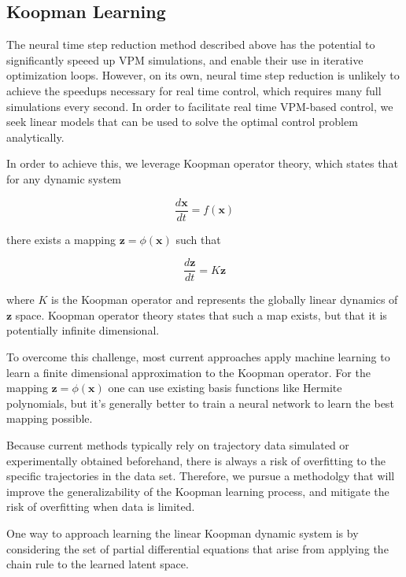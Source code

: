 \documentclass[12pt, letterpaper]{article}
\begin{document}
\subsection{Koopman Learning}

The neural time step reduction method described above has the potential to significantly speeed up VPM simulations, and enable their use in iterative optimization loops.  However, on its own, neural time step reduction is unlikely to achieve the speedups necessary for real time control, which requires many full simulations every second.  In order to facilitate real time VPM-based control, we seek linear models that can be used to solve the optimal control problem analytically. 

In order to achieve this, we leverage Koopman operator theory, which states that for any dynamic system

\begin{equation}
    \frac{d \mathbf{x}}{dt} = f(\mathbf{x})
\end{equation}

there exists a mapping $\mathbf{z} = \phi(\mathbf{x})$ such that 

\begin{equation}
    \label{eq:Koopman}
    \frac{d\mathbf{z}}{dt} = K \mathbf{z}
\end{equation}

where $K$ is the Koopman operator and represents the globally linear dynamics of $\mathbf{z}$ space. Koopman operator theory states that such a map exists, but that it is potentially infinite dimensional. 

To overcome this challenge, most current approaches apply machine learning to learn a finite dimensional approximation to the Koopman operator.  For the mapping $\mathbf{z} = \phi(\mathbf{x})$ one can use existing basis functions like Hermite polynomials, but it's generally better to train a neural network to learn the best mapping possible.

Because current methods typically rely on trajectory data simulated or experimentally obtained beforehand, there is always a risk of overfitting to the specific trajectories in the data set.  Therefore, we pursue a methodolgy that will improve the generalizability of the Koopman learning process, and mitigate the risk of overfitting when data is limited.

One way to approach learning the linear Koopman dynamic system is by considering the set of partial differential equations that arise from applying the chain rule to the learned latent space.
\end{document}
